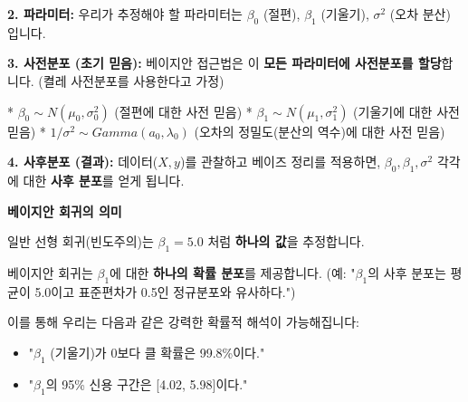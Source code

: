 \documentclass[11pt,a4paper]{book}
\theoremstyle{definition}
\begin{document}
\textbf{2. 파라미터:}
우리가 추정해야 할 파라미터는 $\beta_0$ (절편), $\beta_1$ (기울기), $\sigma^2$ (오차 분산) 입니다.

\textbf{3. 사전분포 (초기 믿음):}
베이지안 접근법은 이 \textbf{모든 파라미터에 사전분포를 할당}합니다.
(켤레 사전분포를 사용한다고 가정)

* $\beta_0 \sim N(\mu_0, \sigma_0^2)$ (절편에 대한 사전 믿음)
* $\beta_1 \sim N(\mu_1, \sigma_1^2)$ (기울기에 대한 사전 믿음)
* $1/\sigma^2 \sim Gamma(a_0, \lambda_0)$ (오차의 정밀도(분산의 역수)에 대한 사전 믿음)

\textbf{4. 사후분포 (결과):}
데이터($X, y$)를 관찰하고 베이즈 정리를 적용하면, $\beta_0, \beta_1, \sigma^2$ 각각에 대한 \textbf{사후 분포}를 얻게 됩니다.

\begin{summarybox}
    \textbf{베이지안 회귀의 의미}
    
    일반 선형 회귀(빈도주의)는 $\beta_1 = 5.0$ 처럼 \textbf{하나의 값}을 추정합니다.
    
    베이지안 회귀는 $\beta_1$에 대한 \textbf{하나의 확률 분포}를 제공합니다.
    (예: "$\beta_1$의 사후 분포는 평균이 5.0이고 표준편차가 0.5인 정규분포와 유사하다.")
    
    이를 통해 우리는 다음과 같은 강력한 확률적 해석이 가능해집니다:
    \begin{itemize}
        \item "$\beta_1$ (기울기)가 0보다 클 확률은 99.8\%이다."
        \item "$\beta_1$의 95\% 신용 구간은 [4.02, 5.98]이다."
    \end{itemize}
\end{summarybox}
\end{document}
